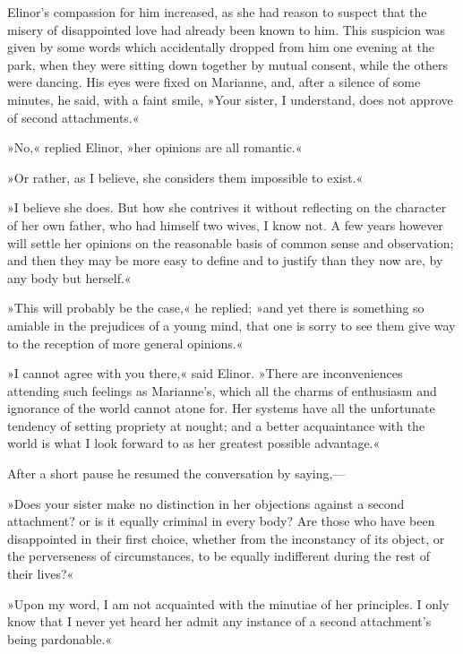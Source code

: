 Elinor’s compassion for him increased, as she had reason to suspect that the misery of disappointed love had already been known to him. This suspicion was given by some words which accidentally dropped from him one evening at the park, when they were sitting down together by mutual consent, while the others were dancing. His eyes were fixed on Marianne, and, after a silence of some minutes, he said, with a faint smile, »Your sister, I understand, does not approve of second attachments.«

»No,« replied Elinor, »her opinions are all romantic.«

»Or rather, as I believe, she considers them impossible to exist.«

»I believe she does. But how she contrives it without reflecting on the character of her own father, who had himself two wives, I know not. A few years however will settle her opinions on the reasonable basis of common sense and observation; and then they may be more easy to define and to justify than they now are, by any body but herself.«

»This will probably be the case,« he replied; »and yet there is something so amiable in the prejudices of a young mind, that one is sorry to see them give way to the reception of more general opinions.«

»I cannot agree with you there,« said Elinor. »There are inconveniences attending such feelings as Marianne’s, which all the charms of enthusiasm and ignorance of the world cannot atone for. Her systems have all the unfortunate tendency of setting propriety at nought; and a better acquaintance with the world is what I look forward to as her greatest possible advantage.«

After a short pause he resumed the conversation by saying,—

»Does your sister make no distinction in her objections against a second attachment? or is it equally criminal in every body? Are those who have been disappointed in their first choice, whether from the inconstancy of its object, or the perverseness of circumstances, to be equally indifferent during the rest of their lives?«

»Upon my word, I am not acquainted with the minutiae of her principles. I only know that I never yet heard her admit any instance of a second attachment’s being pardonable.«


